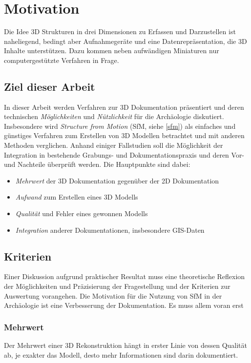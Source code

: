 \chapter{Motivation}
	Die Idee 3D Strukturen in drei Dimensionen zu Erfassen und Darzustellen ist naheliegend, bedingt aber Aufnahmegeräte und eine Datenrepräsentation, die 3D Inhalte unterstützen. Dazu kommen neben aufwändigen Miniaturen nur computergestützte Verfahren in Frage.
	
	\section{Ziel dieser Arbeit} \label{frag:ziel}
		In dieser Arbeit werden Verfahren zur 3D Dokumentation präsentiert und deren technischen \emph{Möglichkeiten} und \emph{Nützlichkeit} für die Archäologie diskutiert.
		Insbesondere wird \emph{Structure from Motion} (SfM, siehe \autoref{sfm}) als einfaches und günstiges Verfahren zum Erstellen von 3D Modellen betrachtet und mit anderen Methoden verglichen.
		Anhand einiger Fallstudien soll die Möglichkeit der Integration in bestehende Grabungs- und Dokumentationspraxis und deren Vor- und Nachteile überprüft werden.
		Die Hauptpunkte sind dabei:
		\begin{itemize}
			\item
			\emph{Mehrwert} der 3D Dokumentation gegenüber der 2D Dokumentation
			\item
			\emph{Aufwand} zum Erstellen eines 3D Modells
			\item
			\emph{Qualität} und Fehler eines gewonnen Modells
			\item
			\emph{Integration} anderer Dokumentationen, insbesondere GIS-Daten
		\end{itemize}
	
	\section{Kriterien} \label{frag:kriterien} %
		Einer Diskussion aufgrund praktischer Resultat muss eine theoretische Reflexion der Möglichkeiten und Präzisierung der Fragestellung und  der Kriterien zur Auswertung vorangehen.
		Die Motivation für die Nutzung von SfM in der Archäologie ist eine Verbesserung der Dokumentation. Es muss allem voran erst
		\subsection{Mehrwert}
			Der Mehrwert einer 3D Rekonstruktion hängt in erster Linie von dessen Qualität ab, je exakter das Modell, desto mehr Informationen sind darin dokumentiert.
			
